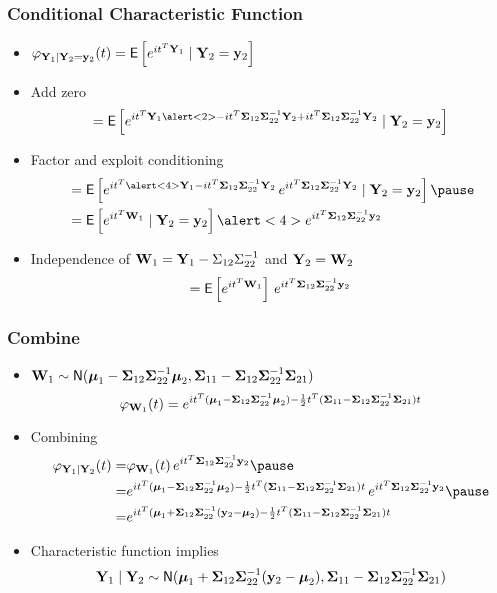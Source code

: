 \documentclass[handout]{beamer}
\begin{document}
\begin{frame}
  \frametitle{Conditional Characteristic Function }
  \begin{block}{}
    \begin{itemize}
    \item
    $\varphi_{\mathbf{Y}_1 \mid \mathbf{Y}_2 = \mathbf{y}_2}(t) = \textsf{E} \left[ e^{i t^T \mathbf{Y}_1} \mid \mathbf{Y}_2 =
      \mathbf{y}_2 \right]$ \pause
\item Add zero
$$
 = \E \left[ e^{i t^T \Y_1  \alert<2>{-i t^T \Sigmab_{12}\Sigmab_{22}^{-1} \Y_2 +
     i t^T \Sigmab_{12}\Sigmab_{22}^{-1} \Y_2 } } \mid \Y_2 =
      \y_2 \right]
$$  \pause
\item Factor and exploit conditioning
  \begin{eqnarray*}
&  = \E \left[ e^{i t^T \alert<4>{\Y_1  -i t^T \Sigmab_{12}\Sigmab_{22}^{-1} \Y_2}}
      \,  e^{
     i t^T \Sigmab_{12}\Sigmab_{22}^{-1} \Y_2 }  \mid \Y_2 =
      \y_2 \right]  \pause
\\
&  = \E \left[ e^{i t^T \W_1} \mid \Y_2 = \y_2 \right] \alert<4>{e^{
     i t^T \Sigmab_{12}\Sigmab_{22}^{-1} \y_2 }}
  \end{eqnarray*} \pause
\item Independence of
   $\mathbf{W}_1 = \mathbf{Y}_1 - \Sigma_{12}\Sigma_{22}^{-1}$ and $\mathbf{Y}_2 = \mathbf{W}_2$
$$ = \textsf{E} \left[ e^{i t^T \mathbf{W}_1} \right]\,  e^{
     i t^T \boldsymbol{\Sigma}_{12}\boldsymbol{\Sigma}_{22}^{-1} \mathbf{y}_2 }  $$
   \end{itemize}

  \end{block}
\end{frame}
\begin{frame}
  \frametitle{Combine}
  \begin{block}{}
    \begin{itemize}
    \item $\mathbf{W}_1 \sim \textsf{N}( \boldsymbol{\mu}_1 - \boldsymbol{\Sigma}_{12} \boldsymbol{\Sigma}_{22}^{-1}
      \boldsymbol{\mu}_2, \boldsymbol{\Sigma}_{11} - \boldsymbol{\Sigma}_{12} \boldsymbol{\Sigma}_{22}^{-1}
      \boldsymbol{\Sigma}_{21})$ \pause
$$\varphi_{\mathbf{W}_1}(t) = e^{i t^T( \boldsymbol{\mu}_1 - \boldsymbol{\Sigma}_{12} \boldsymbol{\Sigma}_{22}^{-1}
      \boldsymbol{\mu}_2) - \frac{1}{2} t^T (\boldsymbol{\Sigma}_{11} - \boldsymbol{\Sigma}_{12} \boldsymbol{\Sigma}_{22}^{-1}
      \boldsymbol{\Sigma}_{21})t}$$ \pause
\item Combining
  \begin{eqnarray*}
\varphi_{\Y_1 \mid \Y_2} (t)  =  & \varphi_{\W_1}(t) \, e^{  i t^T
    \Sigmab_{12}\Sigmab_{22}^{-1} \y_2 } \pause \\
    = & e^{i t^T( \mub_1 - \Sigmab_{12} \Sigmab_{22}^{-1}
      \mub_2) - \frac{1}{2} t^T (\Sigmab_{11} - \Sigmab_{12} \Sigmab_{22}^{-1}
      \Sigmab_{21})t} \, e^{  i t^T
    \Sigmab_{12}\Sigmab_{22}^{-1} \y_2 } \pause   \\
 =  & e^{i t^T( \mub_1 + \Sigmab_{12} \Sigmab_{22}^{-1}( \y_2 -
      \mub_2) - \frac{1}{2} t^T (\Sigmab_{11} - \Sigmab_{12} \Sigmab_{22}^{-1}
      \Sigmab_{21})t}
  \end{eqnarray*} \pause
\item Characteristic function implies
$$
\mathbf{Y}_1 \mid \mathbf{Y}_2 \sim \textsf{N}( \boldsymbol{\mu}_1 + \boldsymbol{\Sigma}_{12} \boldsymbol{\Sigma}_{22}^{-1}( \mathbf{y}_2 -
      \boldsymbol{\mu}_2),  \boldsymbol{\Sigma}_{11} - \boldsymbol{\Sigma}_{12} \boldsymbol{\Sigma}_{22}^{-1}
      \boldsymbol{\Sigma}_{21})
$$
  \end{itemize}
  \end{block}
\end{frame}
\end{document}

